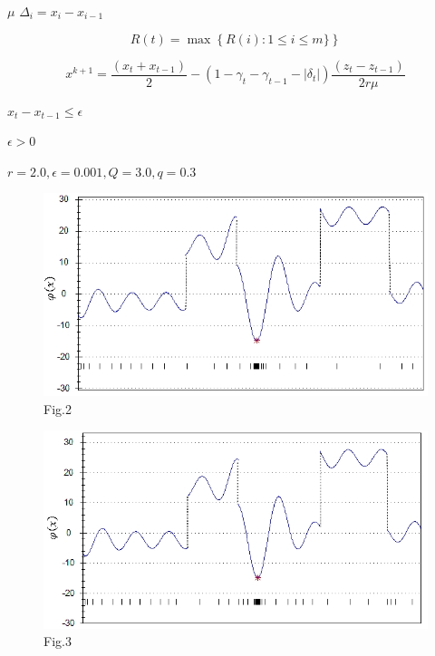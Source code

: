 \documentclass[runningheads]{llncs}
\begin{document}
$\mu$ $\Delta_i=x_i-x_{i-1}$

\begin{equation}\label{R}
R(t)=\max\left\{R(i): 1 \leq i \leq m\}\right\}
\end{equation}

\begin{equation}\label{new_x_2}
x^{k+1}=\frac {(x_t+x_{t-1})}{2}-(1-\gamma_t-\gamma_{t-1}- |\delta_t|) \frac{(z_t-z_{t-1})}{2r\mu}
\end{equation}

$x_t-x_{t-1} \leq \epsilon$

$\epsilon > 0$

$r=2.0,\epsilon=0.001,Q=3.0,q=0.3$

\begin{figure}[!ht]
	\begin{center}
			\includegraphics[width=0.9\linewidth]{ris_2.jpg}
			\caption{Fig.2}
      \label{ris2}
	\end{center}
\end{figure}

\begin{figure}[!ht]
	\begin{center}
			\includegraphics[width=0.9\linewidth]{ris_3.jpg}
			\caption{Fig.3}
      \label{ris3}
	\end{center}
\end{figure}
\end{document}
